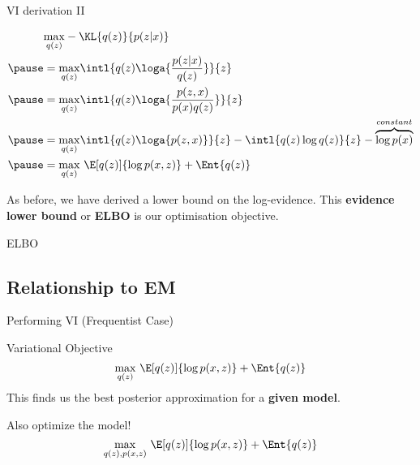 \documentclass[14pt, aspectratio=169]{beamer}
\begin{document}
\begin{frame}{VI derivation II}
\begin{small}
\begin{equation*}
\begin{aligned}
&\underset{q(z)}{\max} -\KL{q(z)}{p(z|x)} \\ 
\pause
&= \underset{q(z)}{\max} \intl{ q(z) \loga{\frac{p(z|x)}{q(z)}}}{z} \\
\pause
&= \underset{q(z)}{\max} \intl{ q(z) \loga{\frac{p(z,x)}{p(x)q(z)}}} {z} \\
\pause
&= \underset{q(z)}{\max} \intl{ q(z) \loga{p(z,x)}} {z} - \intl{ q(z) \log q(z)} {z} 
- \overbrace{\log p(x)}^{constant} \\
\pause
&= \underset{q(z)}{\max}~\E[q(z)]{\log p(x,z) } + \Ent{q(z)}
\end{aligned}
\end{equation*}
\end{small}
\end{frame}

\begin{frame}
As before, we have derived a lower bound on the log-evidence. This \textbf{evidence lower bound}
or \textbf{ELBO} is our optimisation objective.
\begin{block}{ELBO}
\center
{}
\end{block}
\end{frame}

\subsection{Relationship to EM}

\begin{frame}{Performing VI (Frequentist Case)}
\begin{block}{Variational Objective}
\begin{equation*}
\underset{q(z)}{\max}~\E[q(z)]{\log p(x,z) } + \Ent{q(z)}
\end{equation*}
This finds us the best posterior approximation for a \textbf{given model}.
\end{block}
\pause
\begin{block}{Also optimize the model!}
\begin{equation*}
\underset{q(z), p(x,z)}{\max}~\E[q(z)]{\log p(x,z) } + \Ent{q(z)}
\end{equation*}
\end{block}
\end{frame}
\end{document}
